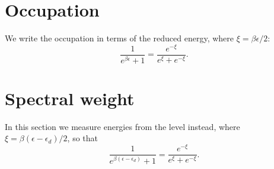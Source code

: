 \documentclass{article}
\begin{document}
\section{Occupation}
We write the occupation in terms of the reduced energy, where $\xi = \beta\epsilon/2$:
\begin{equation}
\frac{1}{e^{\beta\epsilon}+1} = \frac{e^{-\xi}}{e^{\xi}+e^{-\xi}} .
\label{eq:occ}
\end{equation}
\section{Spectral weight}
In this section we measure energies from the level instead, where $\xi = \beta(\epsilon-\epsilon_d)/2$, so that
\begin{equation}
\frac{1}{e^{\beta(\epsilon-\epsilon_d)}+1} = \frac{e^{-\xi}}{e^{\xi}+e^{-\xi}} .
\label{eq:spec}
\end{equation}
\end{document}
